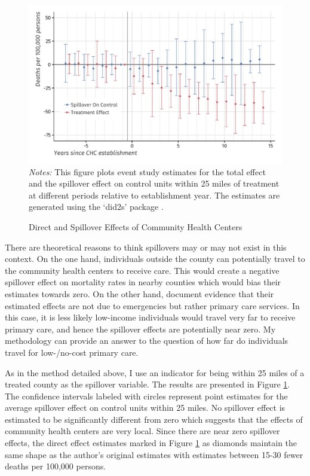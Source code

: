 \documentclass[11pt]{article}
\begin{document}
\begin{figure}[tb!]
    \caption{Direct and Spillover Effects of Community Health Centers}
    \label{fig:chc_es_spill}
        
    {\centering
        \includegraphics[width=\textwidth]{../../figures/figure-chc-es_combined.pdf}
    }
    {\footnotesize
        \textit{Notes:} This figure plots event study estimates for the total effect and the spillover effect on control units within 25 miles of treatment at different periods relative to establishment year. The estimates are generated using the `did2s' package \citep{did2s}. 
    }
\end{figure}


There are theoretical reasons to think spillovers may or may not exist in this context. On the one hand, individuals outside the county can potentially travel to the community health centers to receive care. This would create a negative spillover effect on mortality rates in nearby counties which would bias their estimates towards zero. On the other hand, \citet{Bailey_Goodman_Bacon_2015} document evidence that their estimated effects are not due to emergencies but rather primary care services. In this case, it is less likely low-income individuals would travel very far to receive primary care, and hence the spillover effects are potentially near zero. My methodology can provide an answer to the question of how far do individuals travel for low-/no-cost primary care.

As in the method detailed above, I use an indicator for being within 25 miles of a treated county as the spillover variable. The results are presented in Figure \ref{fig:chc_es_spill}. The confidence intervals labeled with circles represent point estimates for the average spillover effect on control units within 25 miles. No spillover effect is estimated to be significantly different from zero which suggests that the effects of community health centers are very local. Since there are near zero spillover effects, the direct effect estimates marked in Figure \ref{fig:chc_es_spill} as diamonds maintain the same shape as the author's original estimates with estimates between 15-30 fewer deaths per 100,000 persons. 
\end{document}
